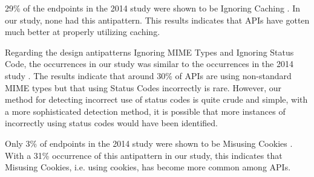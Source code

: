 29\% of the endpoints in the 2014 study were shown to be Ignoring Caching \cite{design}. In our study, none had this antipattern. This results indicates that APIs have gotten much better at properly utilizing caching. 

Regarding the design antipatterns Ignoring MIME Types and Ignoring Status Code, the occurrences in our study was similar to the occurrences in the 2014 study \cite{design}. The results indicate that around 30\% of APIs are using non-standard MIME types but that using Status Codes incorrectly is rare. However, our method for detecting incorrect use of status codes is quite crude and simple, with a more sophisticated detection method, it is possible that more instances of incorrectly using status codes would have been identified. 

Only 3\% of endpoints in the 2014 study were shown to be Misusing Cookies \cite{design}. With a 31\% occurrence of this antipattern in our study, this indicates that Misusing Cookies, i.e. using cookies, has become more common among APIs. 

\clearpage
\newpage